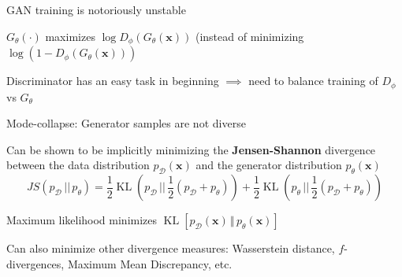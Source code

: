 \documentclass{beamer}
\let\tempone\itemize
\let\temptwo\enditemize
\renewenvironment{itemize}{\tempone\addtolength{\itemsep}{0.5\baselineskip}}{\temptwo}
\DeclareMathOperator{\KL}{KL}
\newcommand{\xvec}{\mathbf{x}}
\begin{document}
\begin{frame}
\begin{center}
\end{center}
GAN training is notoriously unstable
\begin{itemize}
\item $G_\theta(\cdot)$ maximizes $\log D_\phi(G_\theta(\xvec))$ (instead of minimizing $\log (1- D_\phi(G_\theta(\xvec)))$ \pause
\item Discriminator has an easy task in beginning $\implies$ need to balance training of $D_\phi$ vs $G_\theta$ \pause
\item Mode-collapse: Generator samples are not diverse
\end{itemize}
\end{frame}

\begin{frame}
\begin{center}
\end{center}
\begin{itemize}
\item Can be shown to be implicitly minimizing the \textbf{Jensen-Shannon} divergence between the data distribution $p_\mathcal{D}(\xvec)$ and the generator distribution $p_\theta(\xvec)$
\[ JS(p_\mathcal{D} \,||\, p_\theta) = \frac{1}{2} \KL(p_\mathcal{D} \, || \, \frac{1}{2}(p_\mathcal{D} + p_\theta)) + \frac{1}{2} \KL(p_\theta \, || \, \frac{1}{2}(p_\mathcal{D} + p_\theta))\] \pause
\item Maximum likelihood minimizes $\KL[p_\mathcal{D} (\xvec) \, \Vert \, p_\theta (\xvec)]$ \pause
\item Can also minimize other divergence measures: Wasserstein distance, $f$-divergences, Maximum Mean Discrepancy, etc.
\end{itemize}
\end{frame}
\end{document}
